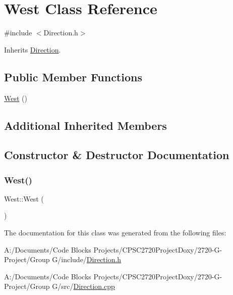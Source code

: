 \hypertarget{class_west}{}\section{West Class Reference}
\label{class_west}


{\ttfamily \#include $<$Direction.\+h$>$}



Inherits \mbox{\hyperlink{class_direction}{Direction}}.

\subsection*{Public Member Functions}
\begin{DoxyCompactItemize}
\item 
\mbox{\hyperlink{class_west_a0504c3d4599d81bfa7e094220495614c}{West}} ()
\end{DoxyCompactItemize}
\subsection*{Additional Inherited Members}


\subsection{Constructor \& Destructor Documentation}
\mbox{\label{class_west_a0504c3d4599d81bfa7e094220495614c}} 
\subsubsection{\texorpdfstring{West()}{West()}}
{\footnotesize\ttfamily West\+::\+West (\begin{DoxyParamCaption}{ }\end{DoxyParamCaption})}



The documentation for this class was generated from the following files\+:\begin{DoxyCompactItemize}
\item 
A\+:/\+Documents/\+Code Blocks Projects/\+C\+P\+S\+C2720\+Project\+Doxy/2720-\/\+G-\/\+Project/\+Group G/include/\mbox{\hyperlink{_direction_8h}{Direction.\+h}}\item 
A\+:/\+Documents/\+Code Blocks Projects/\+C\+P\+S\+C2720\+Project\+Doxy/2720-\/\+G-\/\+Project/\+Group G/src/\mbox{\hyperlink{_direction_8cpp}{Direction.\+cpp}}\end{DoxyCompactItemize}
